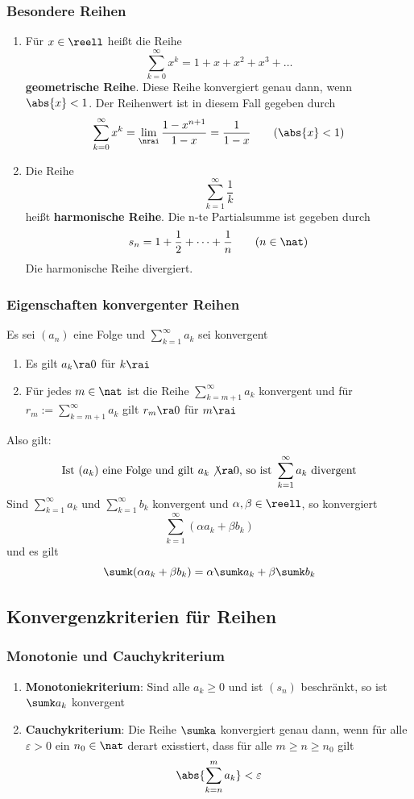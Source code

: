 \documentclass{kit}
\newcommand\f{(a_n)}
\begin{document}
    \subsubsection{Besondere Reihen}
      \begin{enumerate}
        \item Für $x\in\reell$ heißt die Reihe
        $$\sum^\infty_{k=0}x^k=1+x+x^2+x^3+\dots$$
        \textbf{geometrische Reihe}. Diese Reihe konvergiert genau dann, wenn $\abs{x}<1$. Der Reihenwert ist in diesem Fall gegeben durch
        $$\sum^\infty_{k=0}x^k=\lim_\nrai\frac{1-x^{n+1}}{1-x}=\frac{1}{1-x}\qquad(\abs{x}<1)$$
      \item Die Reihe
        $$\sum^\infty_{k=1}\frac{1}{k}$$
        heißt \textbf{harmonische Reihe}. Die n-te Partialsumme ist gegeben  durch
      $$s_n=1+\frac{1}{2}+\dots+\frac{1}{n}\qquad (n\in\nat)$$
      Die harmonische Reihe divergiert.
      \end{enumerate}
    \subsubsection{Eigenschaften konvergenter Reihen}
      Es sei $\f$ eine Folge und $\sum^\infty_{k=1}a_k$ sei konvergent
      \begin{enumerate}
        \item Es gilt $a_k\ra0$ für $k\rai$
        \item Für jedes $m\in\nat$ ist die Reihe $\sum^\infty_{k=m+1}a_k$ konvergent und für $r_m:=\sum^\infty_{k=m+1}a_k$ gilt $r_m\ra0$ für $m\rai$
      \end{enumerate}
      Also gilt:
      $$\text{Ist }(a_k)\text{ eine Folge und gilt }a_k\not\ra0\text{, so ist }\sum^\infty_{k=1}a_k\text{ divergent}$$
      Sind $\sum^\infty_{k=1}a_k$ und $\sum^\infty_{k=1}b_k$ konvergent und $\alpha,\beta\in\reell$, so konvergiert
      $$\sum^\infty_{k=1}(\alpha a_k+\beta b_k)$$
      und es gilt 
      $$\sumk(\alpha a_k+\beta b_k)=\alpha\sumk a_k+\beta\sumk b_k$$
  \subsection{Konvergenzkriterien für Reihen}
    \subsubsection{Monotonie und Cauchykriterium}
      \begin{enumerate}
        \item \textbf{Monotoniekriterium}: Sind alle $a_k\ge0$ und ist $(s_n)$ beschränkt, so ist $\sumk a_k$ konvergent
        \item \textbf{Cauchykriterium}: Die Reihe $\sumka$ konvergiert genau dann, wenn für alle $\varepsilon>0$ ein $n_0\in\nat$ derart exisstiert, dass für alle $m\ge n\ge n_0$ gilt
          $$\abs{\sum^m_{k=n}a_k}<\varepsilon$$
      \end{enumerate}
\end{document}

